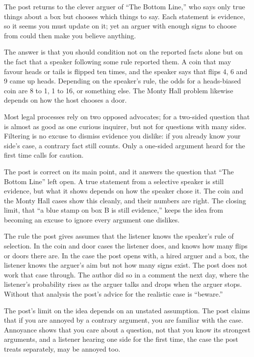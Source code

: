 \begin{afterword}
\summaryhead

The post returns to the clever arguer of ``The Bottom Line,'' who says only true things about a box but chooses which things to say. Each statement is evidence, so it seems you must update on it; yet an arguer with enough signs to choose from could then make you believe anything.

The answer is that you should condition not on the reported facts alone but on the fact that a speaker following some rule reported them. A coin that may favour heads or tails is flipped ten times, and the speaker says that flips 4, 6 and 9 came up heads. Depending on the speaker's rule, the odds for a heads-biased coin are 8 to 1, 1 to 16, or something else. The Monty Hall problem likewise depends on how the host chooses a door.

Most legal processes rely on two opposed advocates; for a two-sided question that is almost as good as one curious inquirer, but not for questions with many sides. Filtering is no excuse to dismiss evidence you dislike: if you already know your side's case, a contrary fact still counts. Only a one-sided argument heard for the first time calls for caution.

\responsehead

The post is correct on its main point, and it answers the question that ``The Bottom Line'' left open. A true statement from a selective speaker is still evidence, but what it shows depends on how the speaker chose it. The coin and the Monty Hall cases show this cleanly, and their numbers are right. The closing limit, that ``a blue stamp on box B is still evidence,'' keeps the idea from becoming an excuse to ignore every argument one dislikes.

The rule the post gives assumes that the listener knows the speaker's rule of selection. In the coin and door cases the listener does, and knows how many flips or doors there are. In the case the post opens with, a hired arguer and a box, the listener knows the arguer's aim but not how many signs exist. The post does not work that case through. The author did so in a comment the next day, where the listener's probability rises as the arguer talks and drops when the arguer stops. Without that analysis the post's advice for the realistic case is ``beware.''

The post's limit on the idea depends on an unstated assumption. The post claims that if you are annoyed by a contrary argument, you are familiar with the case. Annoyance shows that you care about a question, not that you know its strongest arguments, and a listener hearing one side for the first time, the case the post treats separately, may be annoyed too.


\end{afterword}
